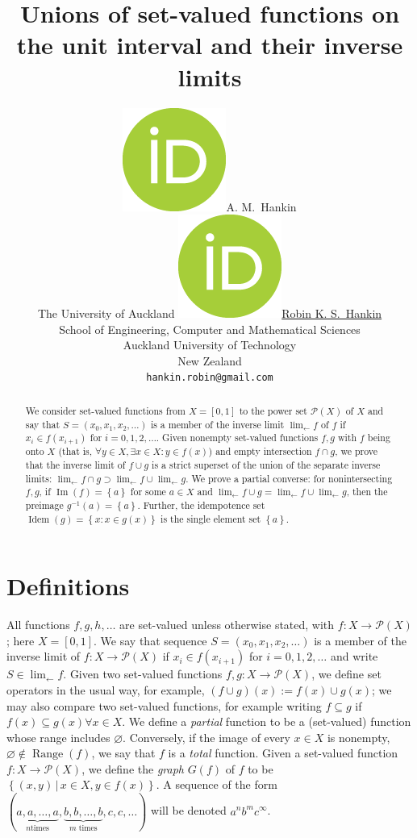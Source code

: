 \documentclass{article}
\title{Unions of set-valued functions on the unit interval and their inverse limits}
\author{{\includegraphics[scale=0.06]{orcid.png}\hspace{1mm}A. M.~Hankin}\\
  The University of Auckland
	\And 
	\href{https://orcid.org/0000-0001-5982-0415}{\includegraphics[scale=0.06]{orcid.png}\hspace{1mm}Robin K. S.~Hankin} \\
	School of Engineering, Computer and Mathematical Sciences\\
	Auckland University of Technology\\
        New Zealand\\
	\texttt{hankin.robin@gmail.com} \\
}
\theoremstyle{definition}
\let\emptyset\varnothing
\begin{document}
\maketitle

\newcommand{\invlim}[1]{\lim_{\leftarrow} #1}

\begin{abstract}
We consider set-valued functions from $X=\left[0,1\right]$ to the
power set $\mathcal{P}(X)$ of $X$ and say that $S = (x_0,x_1,
x_2,\ldots)$ is a member of the inverse limit $\invlim{f}$ of $f$ if
$x_i\in f(x_{i+1})$ for $i = 0,1,2,\ldots$.  Given nonempty set-valued
functions $f,g$ with $f$ being onto $X$ (that is, $\forall y\in X,
\exists x\in X\colon y\in f(x)$) and empty intersection $f\cap g$, we
prove that the inverse limit of $f\cup g$ is a strict superset of the
union of the separate inverse limits: $\invlim{f\cap g}
\supset\invlim{f}\cup\invlim{g}$.  We prove a partial converse: for
nonintersecting $f,g$, if $\operatorname{Im}(f)=\left\lbrace
a\right\rbrace$ for some $a\in X$ and $\invlim{f\cup g} =
\invlim{f}\cup\invlim{g$}, then the preimage $g^{-1}(a)=\left\lbrace
a\right\rbrace$.  Further, the idempotence set
$\operatorname{Idem}(g)=\left\lbrace x\colon x\in g(x)\right\rbrace$
is the single element set $\left\lbrace a\right\rbrace$.
\end{abstract}


\section{Definitions}

All functions $f,g,h,\ldots$ are set-valued unless otherwise stated,
with $f\colon X\longrightarrow\mathcal{P}(X)$; here $X=[0,1]$.  We say
that sequence $S = (x_0 , x_1 , x_2 ,\ldots)$ is a member of the
inverse limit of $f\colon X\longrightarrow \mathcal{P}(X)$ if $x_i \in
f(x_{i+1})$ for $i = 0, 1, 2,\ldots$ and write
$S\in\lim_{\leftarrow}f$.  Given two set-valued functions $f,g\colon X
\rightarrow \mathcal{P}(X)$, we define set operators in the usual way,
for example, $(f\cup g)(x) := f(x)\cup g(x)$; we may also compare two
set-valued functions, for example writing $f\subseteq g$ if
$f(x)\subseteq g(x)\forall x\in X$.  We define a {\em partial}
function to be a (set-valued) function whose range includes
$\emptyset$.  Conversely, if the image of every $x\in X$ is nonempty,
$\emptyset\not\in\operatorname{Range}(f)$, we say that $f$ is a {\em
  total} function.  Given a set-valued function $f\colon X
\longrightarrow \mathcal{P}(X)$, we define the {\em graph} $G(f)$ of
$f$ to be $\left\lbrace (x, y) \,|\, x\in X,y \in f(x)\right\rbrace$.
A sequence of the form $( \underbrace{a, a,\ldots, a}_{\text{$n$
    times}}, \underbrace{b, b,\ldots, b}_{\text{$m$ times}},
c,c,\ldots)$ will be denoted $a^nb^mc^\infty$.
\end{document}
